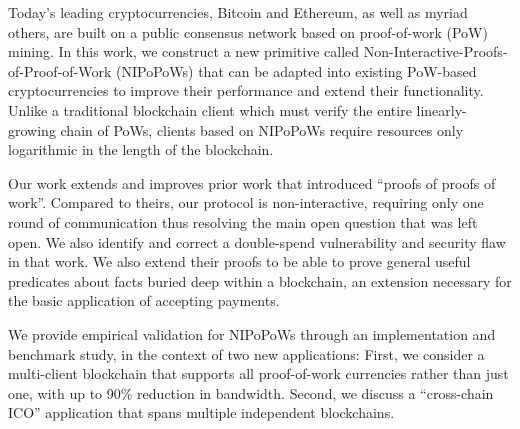 Today's leading cryptocurrencies, Bitcoin and Ethereum, as well as myriad
others, are built on a public consensus network based on proof-of-work (PoW)
mining. In this work, we construct a new primitive called
Non-Interactive-Proofs-of-Proof-of-Work (NIPoPoWs) that can be adapted into
existing PoW-based cryptocurrencies to improve their performance and extend
their functionality. Unlike a traditional blockchain client which must verify
the entire linearly-growing chain of PoWs, clients based on NIPoPoWs require
resources only logarithmic in the length of the blockchain.

Our work  extends and improves prior work that introduced ``proofs of proofs of
work''. Compared to theirs, our protocol is non-interactive, requiring only one
round of communication thus resolving the main open question that was left open.
We also identify and correct a double-spend vulnerability and security flaw in
that work. We also extend their proofs to be able to prove general useful
predicates about facts buried deep within a blockchain, an extension necessary
for the basic application of accepting payments.

We provide empirical validation for NIPoPoWs through an implementation and
benchmark study, in the context of two new applications: First, we consider a
multi-client blockchain that supports all proof-of-work currencies rather than
just one, with up to 90\% reduction in bandwidth.  Second, we discuss a
``cross-chain ICO'' application that spans multiple independent blockchains.
